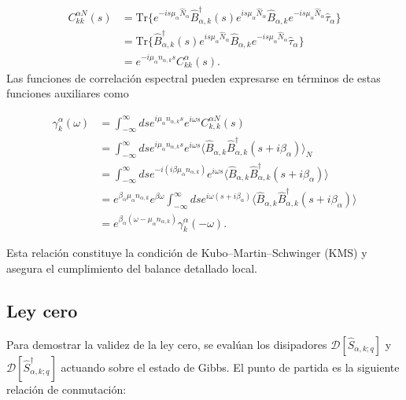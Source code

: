 \begin{appendixs}
\begin{align*}
    C^{\alpha N}_{kk}(s) & = \text{Tr}\{e^{-is\mu_{\alpha}\hat{N}_{\alpha} }\hat{B}^{\dagger}_{\alpha,k}(s)e^{is\mu_{\alpha}\hat{N}_{\alpha}} \hat{B}_{\alpha,k}e^{-is\mu_{\alpha}\hat{N}_{\alpha} }\hat{\tau}_{\alpha}   \} \\
 & = \text{Tr}\{\hat{B}^{\dagger}_{\alpha,k}(s)e^{is\mu_{\alpha}\hat{N}_{\alpha}} \hat{B}_{\alpha,k}e^{-is\mu_{\alpha}\hat{N}_{\alpha}}\hat{\tau}_{\alpha}   \}\\
 & = e^{-i\mu_{\alpha}n_{\alpha,k}s} C^{\alpha}_{kk}(s).
\end{align*}
Las funciones de correlación espectral pueden expresarse en términos de estas funciones auxiliares como

\begin{align*}
    \gamma^{\alpha}_{k}(\omega) & = \int_{-\infty}^{\infty}ds e^{i\mu_{\alpha}n_{\alpha,k}s} e^{i\omega s}C^{\alpha N}_{k,k}(s) \\
    & = \int_{-\infty}^{\infty}ds e^{i\mu_{\alpha}n_{\alpha,k}s} e^{i\omega s}\langle \hat{B}_{\alpha,k} \hat{B}^{\dagger}_{\alpha,k}(s+i\beta_{\alpha}) \rangle_{N} \\
    & = \int_{-\infty}^{\infty}ds e^{-i(i\beta \mu_{\alpha}n_{\alpha,k})} e^{i\omega s} \langle \hat{B}_{\alpha,k}\hat{B}^{\dagger}_{\alpha,k}(s+i\beta_{\alpha}) \rangle \\
    & = e^{\beta_{\alpha}\mu_{\alpha}n_{\alpha,k}}e^{\beta \omega} \int_{-\infty}^{\infty} ds e^{i\omega(s+i\beta_{\alpha})} \langle \hat{B}_{\alpha,k}\hat{B}^{\dagger}_{\alpha,k}(s+i\beta_{\alpha}) \rangle \\
    & = e^{\beta_{\alpha}(\omega - \mu_{\alpha}n_{\alpha,k})} \gamma^{\alpha}_{k}(-\omega).
\end{align*}

Esta relación constituye la condición de Kubo–Martin–Schwinger (KMS) y asegura el cumplimiento del balance detallado local.

\label{apendixKMS}





\subsection{Ley cero}

Para demostrar la validez de la ley cero, se evalúan los disipadores $\mathcal{D}[\hat{S}_{\alpha,k;q}]$ y $\mathcal{D}[\hat{S}^{\dagger}_{\alpha,k;q}]$ actuando sobre el estado de Gibbs. El punto de partida es la siguiente relación de conmutación:


\end{appendixs}
